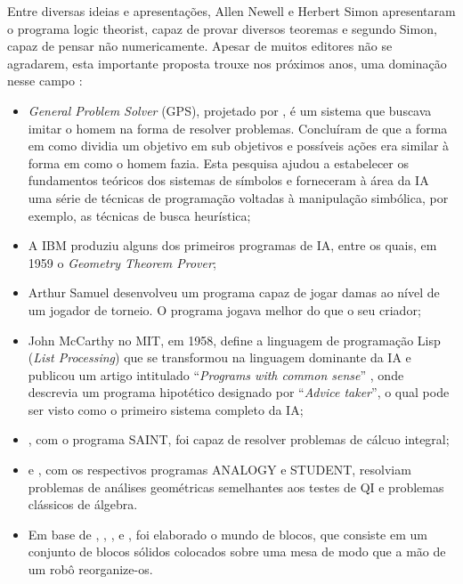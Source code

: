 \documentclass[
  openany]{book}
\begin{document}
Entre diversas ideias e apresentações, Allen Newell e Herbert Simon apresentaram o programa logic theorist, capaz de provar diversos teoremas e segundo Simon, capaz de pensar não numericamente. Apesar de muitos editores não se agradarem, esta importante proposta trouxe nos próximos anos, uma dominação nesse campo \citep{russel2004inteligencia}:

\begin{itemize}
\item
  \emph{General Problem Solver} (GPS), projetado por \citet{newell1959variety}, é um sistema que buscava imitar o homem na forma de resolver problemas. Concluíram de que a forma em como dividia um objetivo em sub objetivos e possíveis ações era similar à forma em como o homem fazia. Esta pesquisa ajudou a estabelecer os fundamentos teóricos dos sistemas de símbolos e forneceram à área da IA uma série de técnicas de programação voltadas à manipulação simbólica, por exemplo, as técnicas de busca heurística;
\item
  A IBM produziu alguns dos primeiros programas de IA, entre os quais, em 1959 o
  \emph{Geometry Theorem Prover};
\item
  Arthur Samuel desenvolveu um programa capaz de jogar damas ao nível de um
  jogador de torneio. O programa jogava melhor do que o seu criador;
\item
  John McCarthy no MIT, em 1958, define a linguagem de programação Lisp (\emph{List Processing}) que se transformou na linguagem dominante
  da IA e publicou um artigo intitulado ``\emph{Programs with common sense}'' \citep{mccarthy1968programs},
  onde descrevia um programa hipotético designado por ``\emph{Advice taker}'', o qual pode
  ser visto como o primeiro sistema completo da IA;
\item
  \citet{slagle1963heuristic}, com o programa SAINT, foi capaz de resolver problemas de cálcuo integral;
\item
  \citet{evans1964program} e \citet{bobrow1967problems}, com os respectivos programas ANALOGY e STUDENT, resolviam problemas de análises geométricas semelhantes aos testes de QI e problemas clássicos de álgebra.
\item
  Em base de \citet{huffman1971impossible}, \citet{waltz1975understanding}, \citet{winograd1972understanding}, \citet{winston1970learning} e \citet{fahlman1974planning}, foi elaborado o mundo de blocos, que consiste em um conjunto de blocos sólidos colocados sobre uma mesa de modo que a mão de um robô reorganize-os.
\end{itemize}
\end{document}
